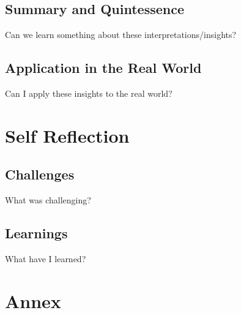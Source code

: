 \documentclass[]{article}
\begin{document}
\begin{spacing}{0.7}
	\subsection{Summary and Quintessence}
		Can we learn something about these interpretations/insights?
	\subsection{Application in the Real World}
		Can I apply these insights to the real world?

\section{Self Reflection}
	\subsection{Challenges}
		What was challenging?
	\subsection{Learnings}
		What have I learned?

\section{Annex}

\end{spacing}
\end{document}
